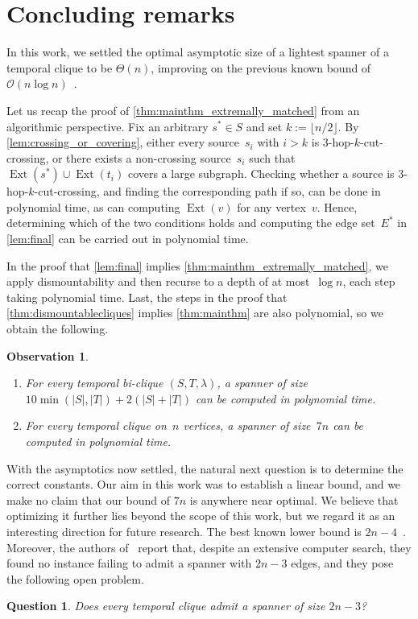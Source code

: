 \documentclass[11pt, letterpaper]{article}
\newcommand{\bigO}{\mathcal{O}}
\DeclareMathOperator{\ext}{Ext}
\theoremstyle{definition}
\theoremstyle{plain}
\newtheorem{observation}[definition]{Observation}
\newtheorem{question}[definition]{Question}
\begin{document}
\section{Concluding remarks}
\label{sec:conclusion}

In this work, we settled the optimal asymptotic size of a lightest spanner of a temporal clique to be $\Theta(n)$, improving on the previous known bound of $\bigO(n \log n)$~\cite{Casteigts21}.

Let us recap the proof of \cref{thm:mainthm_extremally_matched} from an algorithmic perspective. 
Fix an arbitrary $s^*\in S$ and set $k:=\lfloor n/2 \rfloor$. 
By \cref{lem:crossing_or_covering}, either every source~$s_i$ with $i>k$ is 3-hop-$k$-cut-crossing, or there exists a non-crossing source~$s_i$ such that $\ext(s^*)\cup\ext(t_i)$ covers a large subgraph. 
Checking whether a source is 3-hop-$k$-cut-crossing, and finding the corresponding path if so, can be done in polynomial time, as can computing $\ext(v)$ for any vertex~$v$. Hence, determining which of the two conditions holds and computing the edge set~$E^*$ in \cref{lem:final} can be carried out in polynomial time.

In the proof that \cref{lem:final} implies \cref{thm:mainthm_extremally_matched},
we apply dismountability and then recurse to a depth of at most~$\log n$, each step taking polynomial time. 
Last, the steps in the proof that \cref{thm:dismountablecliques} implies \cref{thm:mainthm} are also polynomial, so we obtain the following.

\begin{observation}
\leavevmode
\begin{enumerate}[label=(\roman*)]
\item For every temporal bi-clique $(S,T,\lambda)$, a spanner of size
      $10\min(|S|,|T|)+2(|S|+|T|)$ can be computed in polynomial time.
\item For every temporal clique on~$n$ vertices, a spanner of size~$7n$
      can be computed in polynomial time.
\end{enumerate}
\end{observation}

With the asymptotics now settled, the natural next question is to determine the correct constants.
Our aim in this work was to establish a linear bound, and we make no claim that our bound of $7n$ is anywhere near optimal.
We believe that optimizing it further lies beyond the scope of this work, but we regard it as an interesting direction for future research.
The best known lower bound is $2n-4$~\cite{bumby1981}.
Moreover, the authors of~\cite{Casteigts21} report that, despite an extensive computer search, they found no instance failing to admit a spanner with $2n-3$ edges, and they pose the following open problem.
\begin{question}
    Does every temporal clique admit a spanner of size $2n-3$?
\end{question}
\end{document}
